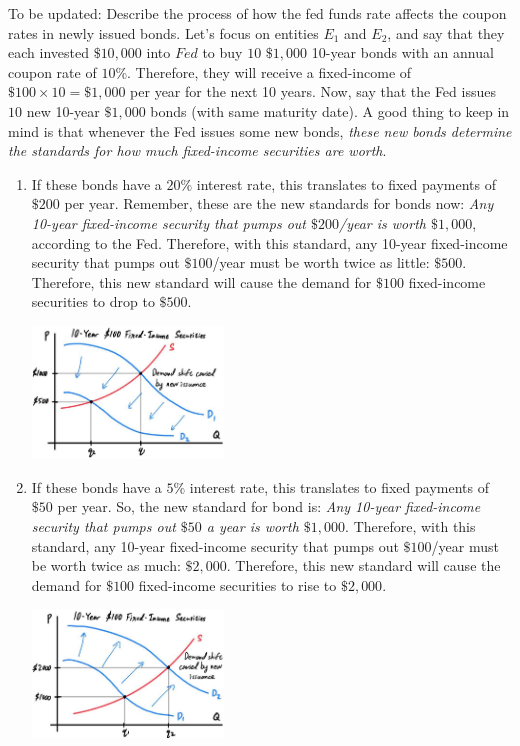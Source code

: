 \documentclass{article}
\begin{document}
    To be updated: Describe the process of how the fed funds rate affects the coupon rates in newly issued bonds.
    Let's focus on entities $E_1$ and $E_2$, and say that they each invested $\$10,000$ into $Fed$ to buy $10$ $\$1,000$ 10-year bonds with an annual coupon rate of $10\%$. Therefore, they will receive a fixed-income of $\$100 \times 10 = \$1,000$ per year for the next 10 years. Now, say that the Fed issues $10$ new 10-year $\$1,000$ bonds (with same maturity date). A good thing to keep in mind is that whenever the Fed issues some new bonds, \textit{these new bonds determine the standards for how much fixed-income securities are worth}.

    \begin{enumerate}
      \item If these bonds have a $20\%$ interest rate, this translates to fixed payments of $\$200$ per year. Remember, these are the new standards for bonds now: \textit{Any 10-year fixed-income security that pumps out $\$200$/year is worth $\$1,000$}, according to the Fed. Therefore, with this standard, any 10-year fixed-income security that pumps out $\$100$/year must be worth twice as little: $\$500$. Therefore, this new standard will cause the demand for $\$100$ fixed-income securities to drop to $\$500$.
      \begin{center}
        \includegraphics[width=0.4\textwidth]{img/Bond_Demand_Decrease.jpg}
      \end{center}
      \item If these bonds have a $5\%$ interest rate, this translates to fixed payments of $\$50$ per year. So, the new standard for bond is: \textit{Any 10-year fixed-income security that pumps out $\$50$ a year is worth $\$1,000$}. Therefore, with this standard, any 10-year fixed-income security that pumps out $\$100$/year must be worth twice as much: $\$2,000$. Therefore, this new standard will cause the demand for $\$100$ fixed-income securities to rise to $\$2,000$.
      \begin{center}
        \includegraphics[width=0.4\textwidth]{img/Bond_Demand_Increase.jpg}
      \end{center}
    \end{enumerate}
\end{document}
